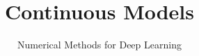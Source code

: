 \documentclass[12pt,fleqn,handout]{beamer}
\date{}
\title[ContMod]{Continuous Models}
\subtitle{Numerical Methods for Deep Learning}
\begin{document}
\makebeamertitle
\end{document}
